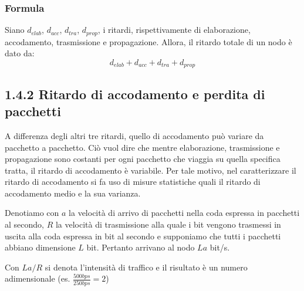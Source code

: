 \documentclass{book}
\begin{document}
\subsubsection{Formula}
Siano $d_{elab}$, $d_{acc}$, $d_{tra}$, $d_{prop}$, i ritardi, rispettivamente di elaborazione, accodamento, trasmissione e propagazione. Allora, il ritardo totale di un nodo è dato da:
$$ d_{elab} + d_{acc} + d_{tra} + d_{prop} $$ 

\subsection*{1.4.2 Ritardo di accodamento e perdita di pacchetti}
A differenza degli altri tre ritardi, quello di accodamento può variare da pacchetto a pacchetto. Ciò vuol dire che mentre elaborazione, trasmissione e propagazione sono costanti per ogni pacchetto che viaggia su quella specifica tratta, il ritardo di accodamento è variabile. Per tale motivo, nel caratterizzare il ritardo di accodamento si fa uso di misure statistiche quali il ritardo di accodamento medio e la sua varianza.

Denotiamo con $a$ la velocità di arrivo di pacchetti nella coda espressa in pacchetti al secondo, $R$ la velocità di trasmissione alla quale i bit vengono trasmessi in uscita alla coda espressa in bit al secondo e supponiamo che tutti i pacchetti abbiano dimensione $L$ bit. Pertanto arrivano al nodo $La$ bit/s.

Con $La/R$ si denota l'intensità di traffico e il risultato è un numero adimensionale (es. $\frac{500bps}{250bps} = 2$)
	
\end{document}

